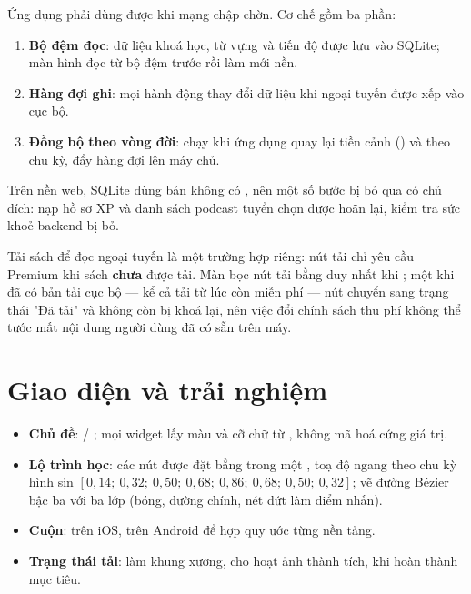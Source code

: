 Ứng dụng phải dùng được khi mạng chập chờn. Cơ chế gồm ba phần:

\begin{enumerate}[leftmargin=1.4em]
  \item \textbf{Bộ đệm đọc}: dữ liệu khoá học, từ vựng và tiến độ được lưu vào SQLite;
  màn hình đọc từ bộ đệm trước rồi làm mới nền.
  \item \textbf{Hàng đợi ghi}: mọi hành động thay đổi dữ liệu khi ngoại tuyến được xếp vào
   cục bộ.
  \item \textbf{Đồng bộ theo vòng đời}:  chạy khi ứng dụng
  quay lại tiền cảnh () và theo chu kỳ, đẩy hàng đợi lên
  máy chủ.
\end{enumerate}

Trên nền web, SQLite dùng bản  không có , nên một số bước bị bỏ
qua có chủ đích: nạp hồ sơ XP và danh sách podcast tuyển chọn được hoãn lại, kiểm tra sức
khoẻ backend bị bỏ.

Tải sách để đọc ngoại tuyến là một trường hợp riêng: nút tải chỉ yêu cầu Premium khi sách
\textbf{chưa} được tải. Màn  bọc nút tải bằng 
duy nhất khi ; một khi đã có bản tải cục bộ — kể cả tải từ lúc
còn miễn phí — nút chuyển sang trạng thái "Đã tải" và không còn bị khoá lại, nên việc đổi
chính sách thu phí không thể tước mất nội dung người dùng đã có sẵn trên máy.

\section{Giao diện và trải nghiệm}

\begin{itemize}[leftmargin=1.4em]
  \item \textbf{Chủ đề}:  / ; mọi widget lấy màu
  và cỡ chữ từ , không mã hoá cứng giá trị.
  \item \textbf{Lộ trình học}: các nút được đặt bằng  trong một
  , toạ độ ngang theo chu kỳ hình sin
  \([0{,}14;\ 0{,}32;\ 0{,}50;\ 0{,}68;\ 0{,}86;\ 0{,}68;\ 0{,}50;\ 0{,}32]\);
   vẽ đường Bézier bậc ba với ba lớp (bóng, đường chính, nét đứt
  làm điểm nhấn).
  \item \textbf{Cuộn}:  trên iOS, 
  trên Android để hợp quy ước từng nền tảng.
  \item \textbf{Trạng thái tải}:  làm khung xương,  cho hoạt ảnh
  thành tích,  khi hoàn thành mục tiêu.
\end{itemize}

